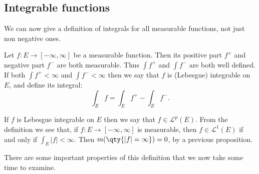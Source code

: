 \documentclass{maths}
\newcommand{\lp}{\mathcal{L}^p}
\begin{document}
\subsection{Integrable functions}

We can now give a definition of integrals for all measurable functions, not just non negative ones.

\begin{defn}
    Let $f\colon E\to[-\infty,\infty]$ be a measurable function.
    Then its positive part $f^+$ and negative part $f^-$ are both measurable.
    Thus $\int f^+$ and $\int f^-$ are both well defined.
    If both $\int f^+<\infty$ and $\int f^-<\infty$ then we say that $f$ is (Lebesgue) integrable on $E$, and define its integral:
    \[
        \int_E f =
        \int_E f^+ - \int_E f^-.
    \]

    If $f$ is Lebesgue integrable on $E$ then we say that $f\in \lp(E)$.
    From the definition we see that, if $f\colon E\to[-\infty,\infty]$ is measurable, then $f\in \mathcal{L}^1(E)$ if and only if $\int_E |f|<\infty$.
    Then $m(\qty{|f|=\infty})=0$, by a previous proposition.
\end{defn}

There are some important properties of this definition that we now take some time to examine.
\end{document}
